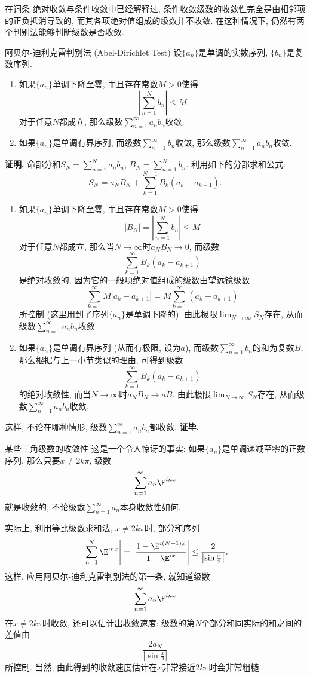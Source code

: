 

在词条 绝对收敛与条件收敛中已经解释过, 条件收敛级数的收敛性完全是由相邻项的正负抵消导致的, 而其各项绝对值组成的级数并不收敛. 在这种情况下, 仍然有两个判别法能够判断级数是否收敛.

\begin{theorem}{阿贝尔-迪利克雷判别法 (Abel-Dirichlet Test)}
设$\{a_n\}$是单调的实数序列, $\{b_n\}$是复数序列.

\begin{enumerate}
\item 如果$\{a_n\}$单调下降至零, 而且存在常数$M>0$使得
$$
\left|\sum_{n=1}^N b_n\right|\leq M
$$
对于任意$N$都成立, 那么级数$\sum_{n=1}^\infty a_nb_n$收敛.

\item 如果$\{a_n\}$是单调有界序列, 而级数$\sum_{n=1}^\infty b_n$收敛, 那么级数$\sum_{n=1}^\infty a_nb_n$收敛.
\end{enumerate}
\end{theorem}

\textbf{证明.} 命部分和$S_N=\sum_{n=1}^N a_nb_n$, $B_N=\sum_{n=1}^N b_n$. 利用如下的分部求和公式:
$$
S_N=a_NB_N+\sum_{k=1}^{N-1}B_k(a_{k}-a_{k+1}).
$$

\begin{enumerate}
\item 如果$\{a_n\}$单调下降至零, 而且存在常数$M>0$使得
$$
|B_N|=\left|\sum_{n=1}^N b_n\right|\leq M
$$
对于任意$N$都成立, 那么当$N\to\infty$时$a_NB_N\to0$, 而级数
$$
\sum_{k=1}^{\infty}B_k(a_{k}-a_{k+1})
$$
是绝对收敛的, 因为它的一般项绝对值组成的级数由望远镜级数
$$
\sum_{k=1}^{\infty}M|a_{k}-a_{k+1}|
=M\sum_{k=1}^{\infty}(a_{k}-a_{k+1})
$$
所控制 (这里用到了序列$\{a_n\}$是单调下降的). 由此极限$\lim_{N\to\infty}S_N$存在, 从而级数$\sum_{n=1}^\infty a_nb_n$收敛.

\item 如果$\{a_n\}$是单调有界序列 (从而有极限, 设为$a$), 而级数$\sum_{n=1}^\infty b_n$的和为复数$B$, 那么根据与上一小节类似的理由, 可得到级数
$$
\sum_{k=1}^{\infty}B_k(a_{k}-a_{k+1})
$$
的绝对收敛性, 而当$N\to\infty$时$a_NB_N\to aB$. 由此极限$\lim_{N\to\infty}S_N$存在, 从而级数$\sum_{n=1}^\infty a_nb_n$收敛.
\end{enumerate}
这样, 不论在哪种情形, 级数$\sum_{n=1}^\infty a_nb_n$都收敛. \textbf{证毕.}

\begin{example}{某些三角级数的收敛性}
这是一个令人惊讶的事实: 如果$\{a_n\}$是单调递减至零的正数序列, 那么只要$x\neq 2k\pi$, 级数
$$
\sum_{n=1}^\infty a_n \E^{inx}
$$
就是收敛的, 不论级数$\sum_{n=1}^\infty a_n$本身收敛性如何.

实际上, 利用等比级数求和法, $x\neq 2k\pi$时, 部分和序列
$$
\left|\sum_{n=1}^N\E^{inx}\right|
=\left|\frac{1-\E^{i(N+1)x}}{1-\E^{ix}}\right|
\leq\frac{2}{\left|\sin\frac{x}{2}\right|}.
$$
这样, 应用阿贝尔-迪利克雷判别法的第一条, 就知道级数
$$
\sum_{n=1}^\infty a_n \E^{inx}
$$
在$x\neq 2k\pi$时收敛, 还可以估计出收敛速度: 级数的第$N$个部分和同实际的和之间的差值由
$$
\frac{2a_N}{\left|\sin\frac{x}{2}\right|}
$$
所控制. 当然, 由此得到的收敛速度估计在$x$非常接近$2k\pi$时会非常粗糙.
\end{example}